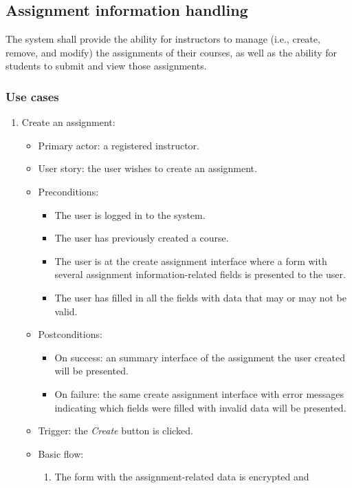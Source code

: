 \subsection{Assignment information handling}
The system shall provide the ability for instructors to manage (i.e., create,
remove, and modify) the assignments of their courses, as well as the ability for
students to submit and view those assignments.

\subsubsection{Use cases}
\begin{enumerate}
\item Create an assignment:
\begin{itemize}
    \item Primary actor: a registered instructor.
    \item User story: the user wishes to create an assignment.
    \item Preconditions:
        \begin{itemize}
            \item The user is logged in to the system.
            \item The user has previously created a course.
            \item The user is at the create assignment interface where a form
                with several assignment information-related fields is
                presented to the user.
            \item The user has filled in all the fields with data that may
                or may not be valid.
        \end{itemize}
    \item Postconditions:
        \begin{itemize}
            \item On success: an summary interface of the assignment the user
                created will be presented.
            \item On failure: the same create assignment interface with error
                messages indicating which fields were filled with invalid data
                will be presented.
        \end{itemize}
    \item Trigger: the \emph{Create} button is clicked.
    \item Basic flow:
        \begin{enumerate}
            \item The form with the assignment-related data is encrypted and

\end{enumerate}
\end{itemize}
\end{enumerate}
